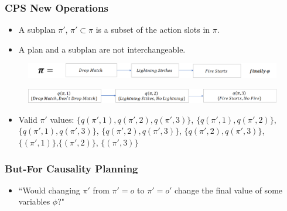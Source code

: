\documentclass{beamer}
\theoremstyle{plain}
\theoremstyle{definition}
\begin{document}
\begin{frame}
\frametitle{CPS New Operations}
\begin{itemize}
\item A subplan $\pi'$, $\pi'\subset \pi$ is a subset of the action slots in $\pi$.
\item A plan and a subplan are not interchangeable.
\end{itemize}

\begin{figure}
\includegraphics[scale=.30]{bobPlanOriginal}
\end{figure}
\begin{figure}
\includegraphics[scale=.35]{bobPlan}
\end{figure}

\begin{itemize}
\item Valid $\pi'$ values: $\{q(\pi',1),q(\pi',2),q(\pi',3)\}$, $\{q(\pi',1),q(\pi',2)\}$, $\{q(\pi',1),q(\pi',3)\}$, $\{q(\pi',2),q(\pi',3)\}$, $\{q(\pi',2),q(\pi',3)\}$, $\{(\pi',1)\}$,$\{(\pi',2)\}$, $\{(\pi',3)\}$
\end{itemize}

\end{frame}


\begin{frame}
\frametitle{But-For Causality Planning}
\begin{itemize}
\item ``Would changing $\pi'$ from $\pi'=o$ to $\pi'= o'$ change the final value of some variables $\phi$?"
\end{itemize}

\end{frame}
\end{document}
